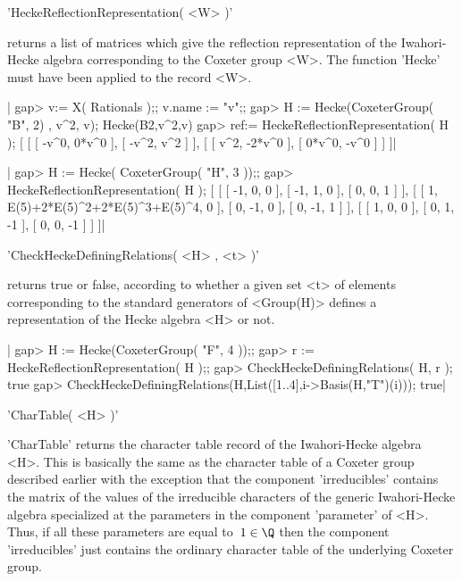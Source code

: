 
'HeckeReflectionRepresentation( <W> )'

returns a list  of matrices which give  the reflection  representation of
the Iwahori-Hecke algebra  corresponding to the  Coxeter group <W>.   The
function 'Hecke' must have been applied to the record <W>.

|    gap> v:= X( Rationals );;  v.name := "v";;
    gap> H := Hecke(CoxeterGroup( "B", 2) , v^2, v);
    Hecke(B2,v^2,v)
    gap> ref:= HeckeReflectionRepresentation( H );
    [ [ [ -v^0, 0*v^0 ], [ -v^2, v^2 ] ],
      [ [ v^2, -2*v^0 ], [ 0*v^0, -v^0 ] ] ]|

|    gap> H := Hecke( CoxeterGroup( "H", 3 ));;
    gap> HeckeReflectionRepresentation( H );
    [ [ [ -1, 0, 0 ], [ -1, 1, 0 ], [ 0, 0, 1 ] ],
      [ [ 1, E(5)+2*E(5)^2+2*E(5)^3+E(5)^4, 0 ], [ 0, -1, 0 ],
          [ 0, -1, 1 ] ], [ [ 1, 0, 0 ], [ 0, 1, -1 ], [ 0, 0, -1 ] ] ]|


'CheckHeckeDefiningRelations( <H> , <t> )'

returns  true or false,  according to whether  a given set  <t> of elements
corresponding   to  the   standard  generators   of  <Group(H)>  defines  a
representation of the Hecke algebra <H> or not.

|    gap> H := Hecke(CoxeterGroup( "F", 4 ));;
    gap> r := HeckeReflectionRepresentation( H );;
    gap> CheckHeckeDefiningRelations( H, r );
    true
    gap> CheckHeckeDefiningRelations(H,List([1..4],i->Basis(H,"T")(i)));
    true|

'CharTable( <H> )'

'CharTable'  returns the  character  table record  of the  Iwahori-Hecke
algebra <H>.  This is  basically the  same as the  character table  of a
Coxeter group  described earlier with  the exception that  the component
'irreducibles'  contains the  matrix of  the values  of the  irreducible
characters  of  the generic  Iwahori-Hecke  algebra  specialized at  the
parameters  in the  component 'parameter'  of  <H>. Thus,  if all  these
parameters are  equal to~$1  \in \Q$  then the  component 'irreducibles'
just contains  the ordinary  character table  of the  underlying Coxeter
group.

